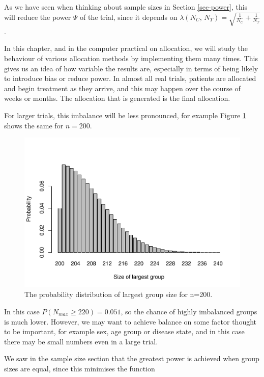 \documentclass[
  openany]{book}
\theoremstyle{definition}
\theoremstyle{definition}
\theoremstyle{definition}
\theoremstyle{definition}
\theoremstyle{remark}
\begin{document}
As we have seen when thinking about sample sizes in Section \ref{sec-power}, this will reduce the power \(\Psi\) of the trial, since it depends on \(\lambda\left(N_C,\,N_T\right) = \sqrt{\frac{1}{N_C} + \frac{1}{N_T}}\).

In this chapter, and in the computer practical on allocation, we will study the behaviour of various allocation methods by implementing them many times. This gives us an idea of how variable the results are, especially in terms of being likely to introduce bias or reduce power. In almost all real trials, patients are allocated and begin treatment as they arrive, and this may happen over the course of weeks or months. The allocation that is generated is the final allocation.

For larger trials, this imbalance will be less pronounced, for example Figure \ref{fig:srsalloc200} shows the same for \(n=200\).

\begin{figure}
\centering
\includegraphics{CT4H_notes_files/figure-latex/srsalloc200-1.pdf}
\caption{\label{fig:srsalloc200}The probability distribution of largest group size for n=200.}
\end{figure}

In this case \(P\left(N_{max} \geq 220\right)=0.051\), so the chance of highly imbalanced groups is much lower. However, we may want to achieve balance on some factor thought to be important, for example sex, age group or disease state, and in this case there may be small numbers even in a large trial.

We saw in the sample size section that the greatest power is achieved when group sizes are equal, since this minimises the function
\end{document}
